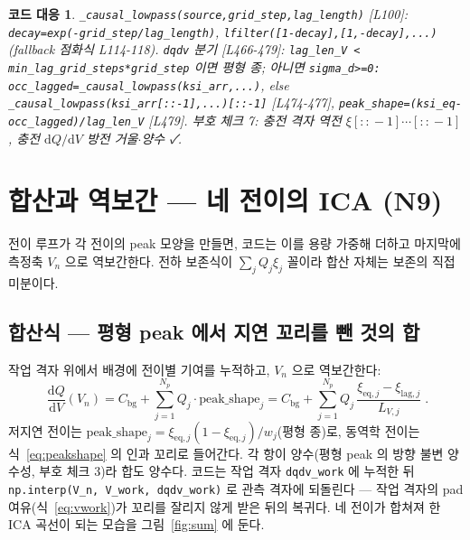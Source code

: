 \documentclass[11pt,a4paper]{article}
\newtheorem*{codebox}{코드 대응}
\newcommand{\dd}{\mathrm{d}}
\newcommand{\eq}{\mathrm{eq}}
\newcommand{\bg}{\mathrm{bg}}
\newcommand{\lagg}{\mathrm{lag}}
\begin{document}
\begin{codebox}
\texttt{\_causal\_lowpass(source,grid\_step,lag\_length)} [L100]: \texttt{decay=exp(-grid\_step/lag\_length)}, \texttt{lfilter([1-decay],[1,-decay],...)} (fallback 점화식 L114-118). \texttt{dqdv} 분기 [L466-479]: \texttt{lag\_len\_V < min\_lag\_grid\_steps*grid\_step} 이면 평형 종; 아니면 \texttt{sigma\_d>=0: occ\_lagged=\_causal\_lowpass(ksi\_arr,...)}, else \texttt{\_causal\_lowpass(ksi\_arr[::-1],...)[::-1]} [L474-477], \texttt{peak\_shape=(ksi\_eq-occ\_lagged)/lag\_len\_V} [L479]. 부호 체크 7: 충전 격자 역전 $\xi[::\!-\!1]\cdots[::\!-\!1]$, 충전 $\dd Q/\dd V$ 방전 거울$\cdot$양수 ✓.
\end{codebox}

\section{합산과 역보간 — 네 전이의 ICA (N9)}\label{sec:sum}
전이 루프가 각 전이의 peak 모양을 만들면, 코드는 이를 용량 가중해 더하고 마지막에 측정축 $V_n$ 으로 역보간한다. 전하 보존식이 $\sum_jQ_j\xi_j$ 꼴이라 합산 자체는 보존의 직접 미분이다.

\subsection{합산식 — 평형 peak 에서 지연 꼬리를 뺀 것의 합}
작업 격자 위에서 배경에 전이별 기여를 누적하고, $V_n$ 으로 역보간한다:
\begin{equation}
\boxed{\;\frac{\dd Q}{\dd V}(V_n)=C_\bg+\sum_{j=1}^{N_p}Q_j\cdot\text{peak\_shape}_j
=C_\bg+\sum_{j=1}^{N_p}Q_j\,\frac{\xi_{\eq,j}-\xi_{\lagg,j}}{L_{V,j}}\;.}
\label{eq:total}
\end{equation}
저지연 전이는 $\text{peak\_shape}_j=\xi_{\eq,j}(1-\xi_{\eq,j})/w_j$(평형 종)로, 동역학 전이는 식~\eqref{eq:peakshape} 의 인과 꼬리로 들어간다. 각 항이 양수(평형 peak 의 방향 불변 양수성, 부호 체크 3)라 합도 양수다. 코드는 작업 격자 \texttt{dqdv\_work} 에 누적한 뒤 \texttt{np.interp(V\_n, V\_work, dqdv\_work)} 로 관측 격자에 되돌린다 — 작업 격자의 pad 여유(식~\eqref{eq:vwork})가 꼬리를 잘리지 않게 받은 뒤의 복귀다. 네 전이가 합쳐져 한 ICA 곡선이 되는 모습을 그림~\ref{fig:sum} 에 둔다.
\end{document}
